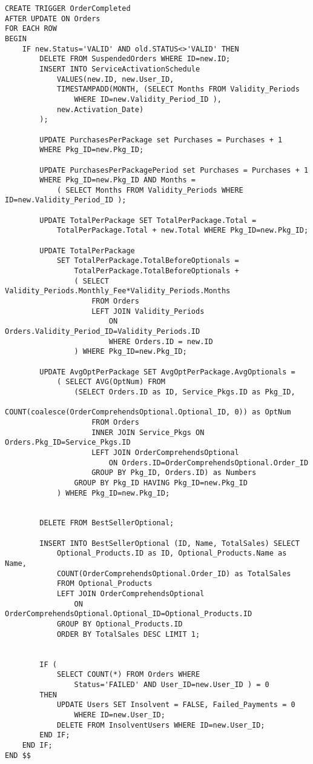 \begin{lstlisting}[style=SQL]
CREATE TRIGGER OrderCompleted
AFTER UPDATE ON Orders
FOR EACH ROW
BEGIN
    IF new.Status='VALID' AND old.STATUS<>'VALID' THEN
        DELETE FROM SuspendedOrders WHERE ID=new.ID;
        INSERT INTO ServiceActivationSchedule
            VALUES(new.ID, new.User_ID,
            TIMESTAMPADD(MONTH, (SELECT Months FROM Validity_Periods
                WHERE ID=new.Validity_Period_ID ),
            new.Activation_Date)
        );

        UPDATE PurchasesPerPackage set Purchases = Purchases + 1
        WHERE Pkg_ID=new.Pkg_ID;

        UPDATE PurchasesPerPackagePeriod set Purchases = Purchases + 1
        WHERE Pkg_ID=new.Pkg_ID AND Months =
            ( SELECT Months FROM Validity_Periods WHERE ID=new.Validity_Period_ID );

        UPDATE TotalPerPackage SET TotalPerPackage.Total =
            TotalPerPackage.Total + new.Total WHERE Pkg_ID=new.Pkg_ID;

        UPDATE TotalPerPackage
            SET TotalPerPackage.TotalBeforeOptionals =
                TotalPerPackage.TotalBeforeOptionals +
                ( SELECT Validity_Periods.Monthly_Fee*Validity_Periods.Months
                    FROM Orders
                    LEFT JOIN Validity_Periods
                        ON Orders.Validity_Period_ID=Validity_Periods.ID
                        WHERE Orders.ID = new.ID
                ) WHERE Pkg_ID=new.Pkg_ID;

        UPDATE AvgOptPerPackage SET AvgOptPerPackage.AvgOptionals =
            ( SELECT AVG(OptNum) FROM
                (SELECT Orders.ID as ID, Service_Pkgs.ID as Pkg_ID,
                    COUNT(coalesce(OrderComprehendsOptional.Optional_ID, 0)) as OptNum
                    FROM Orders
                    INNER JOIN Service_Pkgs ON Orders.Pkg_ID=Service_Pkgs.ID
                    LEFT JOIN OrderComprehendsOptional
                        ON Orders.ID=OrderComprehendsOptional.Order_ID
                    GROUP BY Pkg_ID, Orders.ID) as Numbers
                GROUP BY Pkg_ID HAVING Pkg_ID=new.Pkg_ID
            ) WHERE Pkg_ID=new.Pkg_ID;


        DELETE FROM BestSellerOptional;

        INSERT INTO BestSellerOptional (ID, Name, TotalSales) SELECT
            Optional_Products.ID as ID, Optional_Products.Name as Name,
            COUNT(OrderComprehendsOptional.Order_ID) as TotalSales
            FROM Optional_Products
            LEFT JOIN OrderComprehendsOptional
                ON OrderComprehendsOptional.Optional_ID=Optional_Products.ID
            GROUP BY Optional_Products.ID
            ORDER BY TotalSales DESC LIMIT 1;


        IF (
            SELECT COUNT(*) FROM Orders WHERE
                Status='FAILED' AND User_ID=new.User_ID ) = 0
        THEN
            UPDATE Users SET Insolvent = FALSE, Failed_Payments = 0
                WHERE ID=new.User_ID;
            DELETE FROM InsolventUsers WHERE ID=new.User_ID;
        END IF;
    END IF;
END $$

\end{lstlisting}

